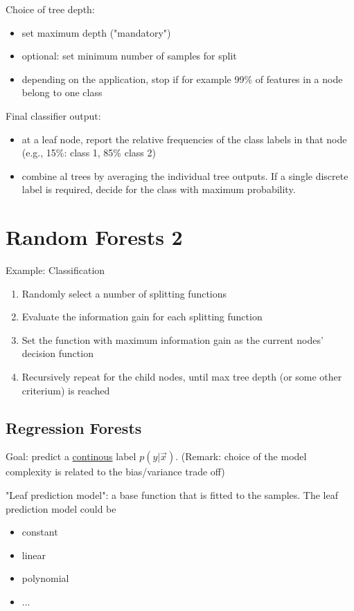 \documentclass{scrartcl}
\begin{document}
Choice of tree depth:
\begin{itemize}
    \item
        set maximum depth ("mandatory")
    \item
        optional: set minimum number of samples for split 
    \item
        depending on the application, stop if for example 99\% of features in a node belong to one class
\end{itemize}

Final classifier output:
\begin{itemize}
    \item
        at a leaf node, report the relative frequencies of the class labels in that node (e.g., 15\%: class 1, 85\% class 2)
    \item
        combine al trees by averaging the individual tree outputs. If a single discrete label is required, decide for the class with maximum probability.
\end{itemize}

\section{Random Forests 2}
Example: Classification
\begin{enumerate}
    \item
        Randomly select a number of splitting functions 
    \item
        Evaluate the information gain for each splitting function
    \item
        Set the function with maximum information gain as the current nodes' decision function
    \item
        Recursively repeat for the child nodes, until max tree depth (or some other criterium) is reached 
\end{enumerate}

\subsection{Regression Forests}
Goal: predict a \underline{continous} label \(p(y|\vec{x})\). (Remark: choice of the model complexity is related to the bias/variance trade off)

"Leaf prediction model": a base function that is fitted to the samples. The leaf prediction model could be
\begin{multicols}{2}
\begin{itemize}
    \item
        constant
    \item
        linear
    \item
        polynomial
    \item
        ...
\end{itemize}
\end{multicols}
\end{document}
